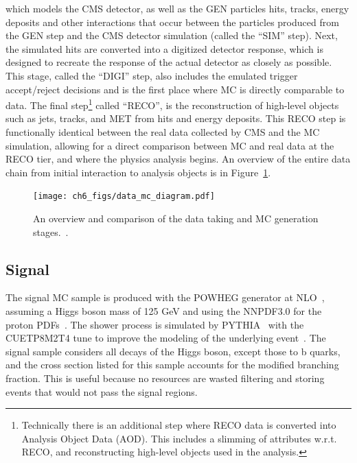 which models the CMS detector, as well as the GEN particles hits, tracks, energy deposits and other interactions that occur
between the particles produced from the GEN step and the CMS detector simulation (called the ``SIM'' step). Next, the simulated
hits are converted into a digitized detector response, which is designed to recreate the response of the actual detector as
closely as possible. This stage, called the ``DIGI'' step, also includes the emulated trigger accept/reject decisions and is the
first place where MC is directly comparable to data. The final step\footnote{Technically there is an additional step where RECO data
is converted into Analysis Object Data (AOD). This includes a slimming of attributes w.r.t. RECO, and reconstructing high-level objects
used in the analysis.} called ``RECO'', is the reconstruction of high-level objects such as jets, tracks, and MET from hits and
energy deposits. This RECO step is functionally identical between the real data collected by CMS and the MC simulation, allowing
for a direct comparison between MC and real data at the RECO tier, and where the physics analysis begins. An overview of the entire
data chain from initial interaction to analysis objects is in Figure~\ref{fig:data_mc_chain}.

\begin{figure}[hbtp]
 \begin{center}
   \texttt{[image: ch6\_figs/data\_mc\_diagram.pdf]}
   \caption[Diagram comparing data taking and MC generation stages]{An overview and comparison of the data taking and MC generation stages.~\cite{cms_pflow_img}.}
   \label{fig:data_mc_chain}
 \end{center}
\end{figure}

\subsection{Signal}
The signal MC sample is produced with the \textsc{POWHEG} generator at NLO~\cite{powheg}, assuming a Higgs boson mass of 125 GeV and using the \textsc{NNPDF3.0} for the proton
PDFs~\cite{nnpdf3}. The shower process is simulated by \textsc{PYTHIA}~\cite{pythia} with the \textsc{CUETP8M2T4} tune to improve the modeling of the underlying event~\cite{CUETP8M2T4}. 
The signal sample considers all decays of the Higgs boson, except those to b quarks, and the cross section listed for this sample accounts for the modified branching fraction.
This is useful because no resources are wasted filtering and storing events that would not pass the signal regions. 

